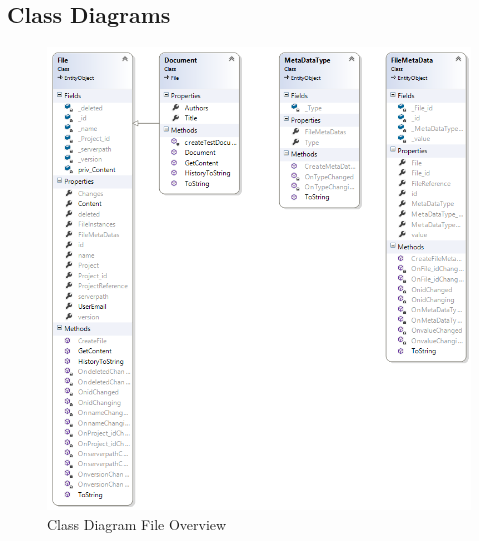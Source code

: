 \subsection{Class Diagrams}
\label{classdiagrams}
\begin{figure}[H]
  \includegraphics[width=\textwidth]{illustrations/classDiagrams/FileOverviewRep_CD.png}
  \caption{Class Diagram File Overview}
\end{figure}
